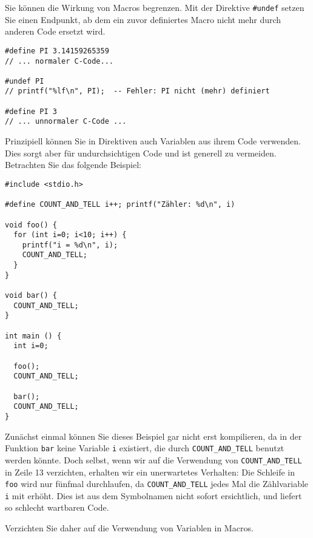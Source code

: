 Sie können die Wirkung von Macros begrenzen. Mit der Direktive \texttt{#undef} setzen Sie einen Endpunkt, ab dem ein zuvor definiertes Macro nicht mehr durch anderen Code ersetzt wird.

\begin{codebox}
\begin{verbatim}
#define PI 3.14159265359
// ... normaler C-Code...

#undef PI
// printf("%lf\n", PI);  -- Fehler: PI nicht (mehr) definiert

#define PI 3
// ... unnormaler C-Code ...
\end{verbatim}
\end{codebox}

\begin{warnbox}
Prinzipiell können Sie in Direktiven auch Variablen aus ihrem Code verwenden. Dies sorgt aber für undurchsichtigen Code und ist generell zu vermeiden. Betrachten Sie das folgende Beispiel:

\begin{codebox}
\begin{verbatim}
#include <stdio.h>

#define COUNT_AND_TELL i++; printf("Zähler: %d\n", i)

void foo() {
  for (int i=0; i<10; i++) {
    printf("i = %d\n", i);
    COUNT_AND_TELL;
  }
}

void bar() {
  COUNT_AND_TELL;
}

int main () {
  int i=0;
  
  foo();
  COUNT_AND_TELL;
  
  bar();
  COUNT_AND_TELL;
}
\end{verbatim}
\end{codebox}

Zunächst einmal können Sie dieses Beispiel gar nicht erst kompilieren, da in der Funktion \texttt{bar} keine Variable \texttt{i} existiert, die durch \texttt{COUNT\_AND\_TELL} benutzt werden könnte. Doch selbst, wenn wir auf die Verwendung von \texttt{COUNT\_AND\_TELL} in Zeile 13 verzichten, erhalten wir ein unerwartetes Verhalten: Die Schleife in \texttt{foo} wird nur fünfmal durchlaufen, da \texttt{COUNT\_AND\_TELL} jedes Mal die Zählvariable \texttt{i} mit erhöht. Dies ist aus dem Symbolnamen nicht sofort ersichtlich, und liefert so schlecht wartbaren Code.

Verzichten Sie daher auf die Verwendung von Variablen in Macros.
\end{warnbox}

